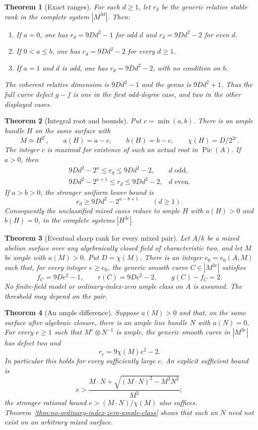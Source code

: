 \documentclass[11pt]{article}
\newtheorem{theorem}{Theorem}[section]
\theoremstyle{definition}\newtheorem{definition}[theorem]{Definition}
\theoremstyle{remark}\newtheorem{remark}[theorem]{Remark}
\newcommand{\Pic}{\operatorname{Pic}}
\begin{document}
\begin{theorem}[Exact ranges]\label{thm:p10exact}
For each $d\ge1$, let $r_d$ be the generic relative stable rank in the complete system $|M^{3d}|$. Then:
\begin{enumerate}
\item If $a=0$, one has $r_d=9Dd^2-1$ for odd $d$ and $r_d=9Dd^2-2$ for even $d$.
\item If $0<a\le b$, one has $r_d=9Dd^2-2$ for every $d\ge1$.
\item If $a=1$ and $d$ is odd, one has $r_d=9Dd^2-2$, with no condition on $b$.
\end{enumerate}
The coherent relative dimension is $9Dd^2-1$ and the genus is $9Dd^2+1$. Thus the full curve defect $g-f$ is one in the first odd-degree case, and two in the other displayed cases.
\end{theorem}

\begin{theorem}[Integral root and bounds]\label{thm:p10bounds}
Put $c=\min(a,b)$. There is an ample bundle $H$ on the same surface with
\[
 M\simeq H^{2^c},\qquad a(H)=a-c,\qquad b(H)=b-c,
 \qquad \chi(H)=D/2^{2c}.
\]
The integer $c$ is maximal for existence of such an actual root in $\Pic(A)$. If $a>0$, then
\[
 \begin{array}{ll}
 9Dd^2-2^a\le r_d\le9Dd^2-2,&d\text{ odd},\\
 9Dd^2-2^{a+1}\le r_d\le9Dd^2-2,&d\text{ even}.
 \end{array}
\]
If $a>b>0$, the stronger uniform lower bound is
\[
                   r_d\ge9Dd^2-2^{a-b+1}\qquad(d\ge1).
\]
Consequently the unclassified mixed cases reduce to ample $H$ with $a(H)>0$ and $b(H)=0$, in the complete systems $|H^{3e}|$.
\end{theorem}

\begin{theorem}[Eventual sharp rank for every mixed pair]\label{thm:eventual-all-mixed}
Let $A/k$ be a mixed abelian surface over any algebraically closed field of characteristic two, and let $M$ be ample with $a(M)>0$. Put $D=\chi(M)$. There is an integer $e_0=e_0(A,M)$ such that, for every integer $e\ge e_0$, the generic smooth curve $C\in|M^{3e}|$ satisfies
\[
 f_C=9De^2-1,\qquad r(C)=9De^2-2,\qquad g(C)-f_C=2.
\]
No finite-field model or ordinary-index-zero ample class on $A$ is assumed. The threshold may depend on the pair.
\end{theorem}

\begin{theorem}[An ample difference]\label{thm:ample-difference}
Suppose $a(M)>0$ and that, on the same surface after algebraic closure, there is an ample line bundle $N$ with $a(N)=0$. For every $e\ge1$ such that $M^e\otimes N^{-1}$ is ample, the generic smooth curve in $|M^{3e}|$ has defect two and
\[
                         r_e=9\chi(M)e^2-2.
\]
In particular this holds for every sufficiently large $e$. An explicit sufficient bound is
\[
 e>\frac{M\cdot N+\sqrt{(M\cdot N)^2-M^2N^2}}{M^2};
\]
the stronger rational bound $e>(M\cdot N)/\chi(M)$ also suffices. Theorem~\ref{thm:no-ordinary-index-zero-ample-class} shows that such an $N$ need not exist on an arbitrary mixed surface.
\end{theorem}
\end{document}
